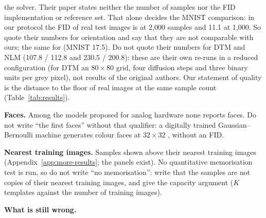 \begin{plan}
        the solver. Their paper states neither the number of samples nor the
        FID implementation or reference set. That alone decides the MNIST
        comparison: in our protocol the FID of real test images is
        \floorMnist{} at 2{,}000 samples and 11.1 at 1{,}000. So quote their
        numbers for orientation and say that they are not comparable with
        ours; the same for \citet{liao2022gaussian} (MNIST 17.5).
        Do not quote their numbers for DTM and NLM (107.8 / 112.8 and
        230.5 / 200.8): these are their own re-runs in a reduced
        configuration (for DTM an $80\times80$ grid, four diffusion steps and
        three binary units per grey pixel), not results of the original
        authors.
        Our statement of quality is the distance to the floor of real images
        at the same sample count (Table~\ref{tab:results}).
  \item \textbf{Faces.} Among the models proposed for analog hardware
        \citep{wangachour2026,jelincic2025dtm} none reports faces. Do not write ``the first
        faces'' without that qualifier: a digitally trained Gaussian--Bernoulli
        machine generates colour faces at $32\times32$
        \citep{liao2022gaussian}, without an FID.
  \item \textbf{Nearest training images.} Samples shown above their nearest
        training images (Appendix~\ref{app:more-results}; the panels exist).
        No quantitative memorisation test is run, so do not write ``no
        memorisation'': write that the samples are not copies of their nearest
        training images, and give the capacity argument ($K$ templates against
        the number of training images).
  \item \textbf{What is still wrong.} 
\end{plan}

